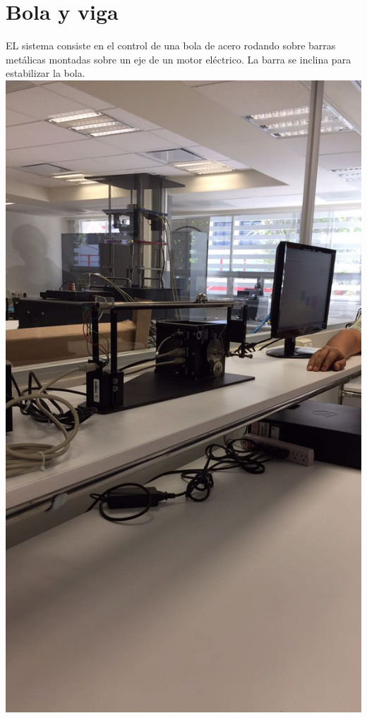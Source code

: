 \documentclass[12pt,a4paper]{book}
\begin{document}
\section{Bola y viga}
EL sistema consiste en el control de una bola de acero rodando sobre barras metálicas montadas sobre un eje de un motor eléctrico. La barra se inclina para estabilizar la bola. 
\\
\includegraphics[scale=.25]{./4.jpeg}

\newpage
\end{document}
